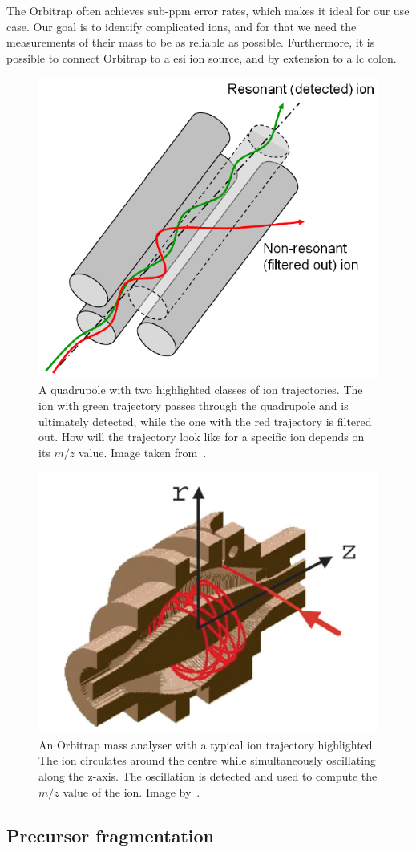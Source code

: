 \begin{description}
    The Orbitrap often achieves sub-ppm error rates, which makes it ideal for our use case. Our goal is to identify complicated ions, and for that we need the measurements of their mass to be as reliable as possible. Furthermore, it is possible to connect Orbitrap to a \gls*{esi} ion source, and by extension to a \gls*{lc} colon.
\end{description}

\begin{figure}
  \centering
  \includegraphics[width=.4\linewidth]{img/quadrupole.png}
  \caption{A quadrupole with two highlighted classes of ion trajectories. The ion with green trajectory passes through the quadrupole and is ultimately detected, while the one with the red trajectory is filtered out. How will the trajectory look like for a specific ion depends on its \(m/z\) value. Image taken from~\citet{2021Mass}.}\label{fig:quadrupole}
\end{figure}

\begin{figure}
  \centering
  \includegraphics[width=.5\linewidth]{img/orbitrap.png}
  \caption{An Orbitrap mass analyser with a typical ion trajectory highlighted. The ion circulates around the centre while simultaneously oscillating along the z-axis. The oscillation is detected and used to compute the \(m/z\) value of the ion. Image by~\citet{hu2005orbitrap}.}\label{fig:orbitrap}
\end{figure}

\subsection{Precursor fragmentation}\label{sec:fragmentation}

